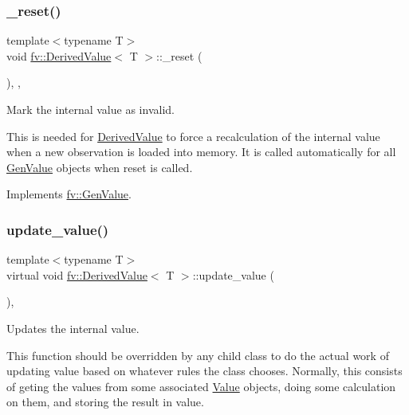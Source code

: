 \subsubsection{\texorpdfstring{\+\_\+reset()}{\_reset()}}
{\footnotesize\ttfamily template$<$typename T$>$ \\
void \hyperlink{classfv_1_1DerivedValue}{fv\+::\+Derived\+Value}$<$ T $>$\+::\+\_\+reset (\begin{DoxyParamCaption}{ }\end{DoxyParamCaption})\hspace{0.3cm}{\ttfamily [inline]}, {\ttfamily [private]}, {\ttfamily [virtual]}}



Mark the internal value as invalid. 

This is needed for \hyperlink{classfv_1_1DerivedValue}{Derived\+Value} to force a recalculation of the internal value when a new observation is loaded into memory. It is called automatically for all \hyperlink{classfv_1_1GenValue}{Gen\+Value} objects when reset is called. 

Implements \hyperlink{classfv_1_1GenValue_a26160e53542b728f9e0c11495dce3c20}{fv\+::\+Gen\+Value}.

\hypertarget{classfv_1_1DerivedValue_ae59e80a98eb74b95d8961bfe12ee5ec2}{}\label{classfv_1_1DerivedValue_ae59e80a98eb74b95d8961bfe12ee5ec2} 
\subsubsection{\texorpdfstring{update\+\_\+value()}{update\_value()}}
{\footnotesize\ttfamily template$<$typename T$>$ \\
virtual void \hyperlink{classfv_1_1DerivedValue}{fv\+::\+Derived\+Value}$<$ T $>$\+::update\+\_\+value (\begin{DoxyParamCaption}{ }\end{DoxyParamCaption})\hspace{0.3cm}{\ttfamily [protected]}, {}}



Updates the internal value. 

This function should be overridden by any child class to do the actual work of updating value based on whatever rules the class chooses. Normally, this consists of geting the values from some associated \hyperlink{classfv_1_1Value}{Value} objects, doing some calculation on them, and storing the result in value. 

